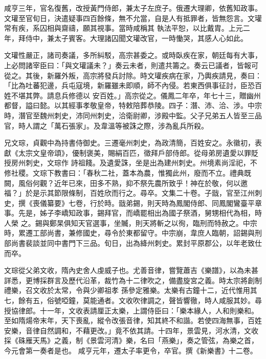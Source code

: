 \begin{pinyinscope}
 咸亨三年，官名復舊，改授黃門侍郎，兼太子左庶子。俄遷大理卿，依舊知政事。文瓘至官旬日，決遣疑事四百餘條，無不允當，自是人有抵罪者，皆無怨言。文瓘常有疾，系囚相與齋禱，願其視事。當時咸稱其
 執法平恕，以比戴胄。上元二年，拜侍中，兼太子賓客。大理諸囚聞文瓘改官，一時慟哭，其感人心如此。



 文瓘性嚴正，諸司奏議，多所糾駁，高宗甚委之。或時臥疾在家，朝廷每有大事，上必問諸宰臣曰：「與文瓘議未？」奏云未者，則遣共籌之。奏云已議者，皆報可從之。其後，新羅外叛，高宗將發兵討除。時文瓘疾病在家，乃輿疾請見，奏曰：「比為吐蕃犯邊，兵屯寇境，新羅雖未即順，師不內侵。若東西俱事征討，臣恐百姓不堪其弊。請息兵修德以
 安百姓。」高宗從之。儀鳳二年卒，年七十三，贈幽州都督，謚曰懿。以其經事孝敬皇帝，特敕陪葬恭陵。四子：潛、沛、洽、涉。中宗時，潛官至魏州刺史，沛同州刺史，洽衛尉卿，涉殿中監。父子兄弟五人皆至三品官，時人謂之「萬石張家」。及韋溫等被誅之際，涉為亂兵所殺。



 兄文琮，貞觀中為持書侍御史。三遷毫州刺史，為政清簡，百姓安之。永徽初，表獻《太宗文皇帝頌》，優制褒美，賜絹百匹，徵拜戶部侍郎。從母弟房遺愛以罪貶授房州刺史，文琮作
 詩祖餞。及遺愛誅，坐是出為建州刺史。州境素尚淫祀，不修社稷。文琮下教書曰：「春秋二社，蓋本為農，惟獨此州，廢而不立。禮典既闕，風俗何觀？近年已來，田多不熟，抑不祭先農所致乎！神在於敬，何以邀福？」於是示其節限條制，百姓欣而行之。尋卒。文集二十卷。子戩，官至江州刺史，撰《喪儀纂要》七卷，行於時。戩弟錫，則天時為鳳閣侍郎、同鳳閣鸞臺平章事。先是，姊子李嶠知政事，錫拜官，而嶠罷相出為國子祭酒，舅甥相代為相，時人榮
 之。錫與鄭杲俱知天官選事，坐贓，則天將斬之以徇，臨刑而特赦之。中宗時，累遷工部尚書，兼修國史，尋令於東都留守。中宗崩，韋庶人臨朝，詔錫與刑部尚書裴談並同中書門下三品。旬日，出為絳州刺史。累封平原郡公，以年老致仕而卒。



 文琮從父弟文收，隋內史舍人虔威子也。尤善音律，嘗覽蕭吉《樂譜》，以為未甚詳悉，更博採群言及歷代沿革，裁竹為十二律吹之，備盡旋宮之義。時太宗將創制禮樂，召文收於太常，令與少卿祖孝
 孫參定雅樂。太樂有古鐘十二，近代惟用其七，餘有五，俗號啞鐘，莫能通者。文收吹律調之，聲皆響徹，時人咸服其妙。尋授協律郎。十一年，文收表請厘正太樂，上謂侍臣曰：「樂本緣人，人和則樂和。至如隋煬帝末年，天下喪亂，縱令改張音律，知其終不和諧。若使四海無事，百姓安樂，音律自然調和，不藉更改。」竟不依其請。十四年，景雲見，河水清，文收採《硃雁天馬》之義，制《景雲河清》樂，名曰「燕樂」，奏之管弦，為樂之首，今元會第一奏者是也。
 咸亨元年，遷太子率更令，卒官。撰《新樂書》十二卷。




\end{pinyinscope}
